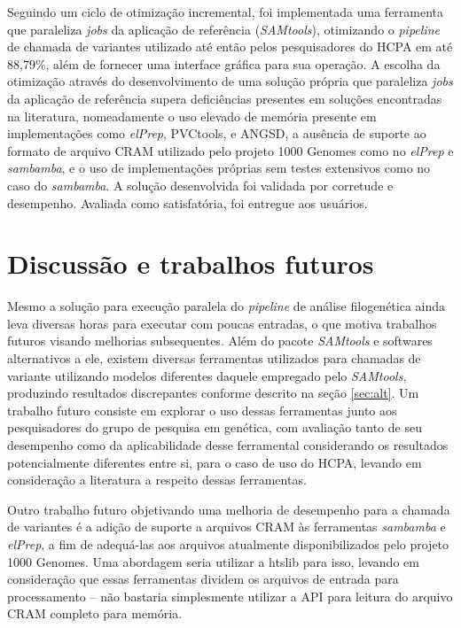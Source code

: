 \documentclass[cic,tc]{iiufrgs}
\begin{document}
Seguindo um ciclo de otimização incremental, foi implementada uma ferramenta
que paraleliza \textit{jobs} da aplicação de referência (\textit{SAMtools}),
otimizando o \textit{pipeline} de chamada de variantes utilizado até então
pelos pesquisadores do HCPA em até 88,79\%, além de fornecer uma interface
gráfica para sua operação. A escolha da otimização através do desenvolvimento
de uma solução própria que paraleliza \textit{jobs} da aplicação de referência
supera deficiências presentes em soluções encontradas na literatura,
nomeadamente o uso elevado de memória presente em implementações como
\textit{elPrep}, PVCtools, e ANGSD, a ausência de suporte ao formato de arquivo
CRAM utilizado pelo projeto 1000 Genomes como no \textit{elPrep} e
\textit{sambamba}, e o uso de implementações próprias sem testes extensivos
como no caso do \textit{sambamba}. A solução desenvolvida foi validada por
corretude e desempenho. Avaliada como satisfatória, foi entregue aos usuários.

\section{Discussão e trabalhos futuros}

Mesmo a solução para execução paralela do \textit{pipeline} de análise
filogenética ainda leva diversas horas para executar com poucas entradas, o que
motiva trabalhos futuros visando melhorias subsequentes. Além do pacote
\textit{SAMtools} e softwares alternativos a ele, existem diversas ferramentas
utilizados para chamadas de variante utilizando modelos diferentes daquele
empregado pelo \textit{SAMtools}, produzindo resultados discrepantes conforme descrito
na seção \ref{sec:alt}. Um trabalho futuro consiste em explorar o uso dessas
ferramentas junto aos pesquisadores do grupo de pesquisa em genética, com
avaliação tanto de seu desempenho como da aplicabilidade desse ferramental
considerando os resultados potencialmente diferentes entre si, para o caso de
uso do HCPA, levando em consideração a literatura a respeito dessas
ferramentas.

Outro trabalho futuro objetivando uma melhoria de desempenho para a chamada de
variantes é a adição de suporte a arquivos CRAM às ferramentas
\textit{sambamba} e \textit{elPrep}, a fim de adequá-las aos arquivos
atualmente disponibilizados pelo projeto 1000 Genomes. Uma abordagem seria
utilizar a htslib para isso, levando em consideração que essas ferramentas
dividem os arquivos de entrada para processamento -- não bastaria simplesmente
utilizar a API para leitura do arquivo CRAM completo para memória.
\end{document}

